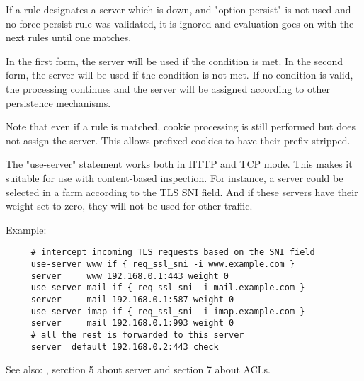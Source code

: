   If a rule designates a server which is down, and "option persist" is not used
  and no force-persist rule was validated, it is ignored and evaluation goes on
  with the next rules until one matches.

  In the first form, the server will be used if the condition is met. In the
  second form, the server will be used if the condition is not met. If no
  condition is valid, the processing continues and the server will be assigned
  according to other persistence mechanisms.

  Note that even if a rule is matched, cookie processing is still performed but
  does not assign the server. This allows prefixed cookies to have their prefix
  stripped.

  The "use-server" statement works both in HTTP and TCP mode. This makes it
  suitable for use with content-based inspection. For instance, a server could
  be selected in a farm according to the TLS SNI field. And if these servers
  have their weight set to zero, they will not be used for other traffic.

  Example:
  \begin{verbatim}
     # intercept incoming TLS requests based on the SNI field
     use-server www if { req_ssl_sni -i www.example.com }
     server     www 192.168.0.1:443 weight 0
     use-server mail if { req_ssl_sni -i mail.example.com }
     server     mail 192.168.0.1:587 weight 0
     use-server imap if { req_ssl_sni -i imap.example.com }
     server     mail 192.168.0.1:993 weight 0
     # all the rest is forwarded to this server
     server  default 192.168.0.2:443 check
  \end{verbatim}

  See also: , serction 5 about server and section 7 about ACLs.
